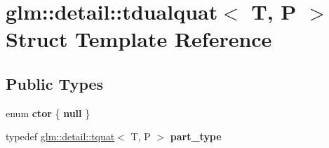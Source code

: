 \hypertarget{structglm_1_1detail_1_1tdualquat}{}\section{glm\+:\+:detail\+:\+:tdualquat$<$ T, P $>$ Struct Template Reference}
\label{structglm_1_1detail_1_1tdualquat}
\subsection*{Public Types}
\begin{DoxyCompactItemize}
\item 
enum {\bfseries ctor} \{ {\bfseries null}
 \}\hypertarget{structglm_1_1detail_1_1tdualquat_ace336aab392c50d450452edacc3d7f41}{}\label{structglm_1_1detail_1_1tdualquat_ace336aab392c50d450452edacc3d7f41}

\item 
typedef \hyperlink{structglm_1_1detail_1_1tquat}{glm\+::detail\+::tquat}$<$ T, P $>$ {\bfseries part\+\_\+type}\hypertarget{structglm_1_1detail_1_1tdualquat_a811e451c41fec5277ac7c99381152df4}{}\label{structglm_1_1detail_1_1tdualquat_a811e451c41fec5277ac7c99381152df4}

\end{DoxyCompactItemize}
